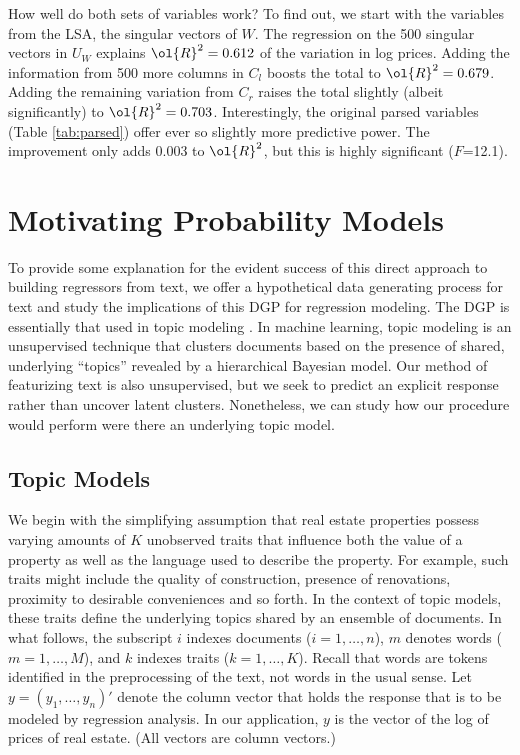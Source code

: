 \documentclass[12pt]{article}
\begin{document}
How well do both sets of variables work?  To find out, we start with the variables from the LSA, the singular vectors of $W$.   The regression on the 500 singular vectors in $U_W$ explains $\ol{R}^2 = 0.612$ of the variation in log prices.  Adding the information from 500 more columns in $C_l$ boosts the total to $\ol{R}^2 = 0.679$.  Adding the remaining variation from $C_r$ raises the total slightly (albeit significantly) to $\ol{R}^2 = 0.703$. Interestingly,  the original parsed variables (Table \ref{tab:parsed}) offer ever so slightly more predictive power. The improvement only adds 0.003 to $\ol{R}^2$, but this is highly significant ($F$=12.1).



\section{Motivating Probability Models}
\label{sec:model}

 To provide some explanation for the evident success of this direct approach to building regressors from text, we offer a hypothetical data generating process for text and study the implications of this DGP for regression modeling.  The DGP is essentially that used in topic modeling \citep{blei12}.  In machine learning, topic modeling is an unsupervised technique that  clusters documents based on the presence of shared, underlying ``topics'' revealed by a hierarchical Bayesian  model.  Our method of featurizing text is also unsupervised,  but we seek to predict an explicit response rather than uncover latent clusters.  Nonetheless, we can study how our procedure would perform were there an underlying topic model.


\subsection {Topic Models}  %

 We begin with the simplifying assumption that real estate properties possess
 varying amounts of $K$ unobserved traits that influence both the value of
 a property as well as the language used to describe the property.  For example,
 such traits might include the quality of construction, presence of renovations,
 proximity to desirable conveniences and so forth.  In the context of topic models, these traits define the underlying topics shared by an ensemble of documents.  In what follows, the subscript $i$ indexes documents ($i = 1,\ldots,n$), $m$ denotes words ($m=1,\ldots,M$), and $k$ indexes traits ($k = 1,\ldots,K$).  Recall that words are tokens identified in the preprocessing of the text, not words in the usual sense.   Let $y = (y_1,\ldots,y_n)'$ denote the column vector that holds the response that is to be modeled by regression analysis.    In our application, $y$ is the vector of the log of prices of real estate. (All vectors are column vectors.)
\end{document}
